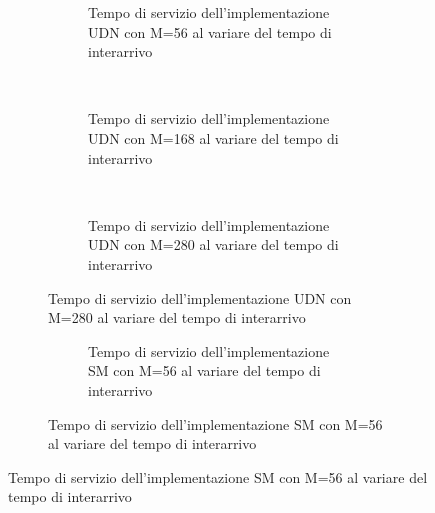 \begin{figure}[p]
  \caption{Grafici del tempo di servizio al variare del tempo di interarrivo}
  \begin{subfigure}[b]{.5\columnwidth}
    \centering
    \renewcommand\thesubfigure{\alph{subfigure}}
    \caption{Implementazione con solo UDN}
    \begin{subfigure}[b]{\textwidth}
      \centering
      \addtocounter{subfigure}{-1}
      \renewcommand\thesubfigure{\alph{subfigure}1}
      \resizebox{\columnwidth}{!}{}
      \caption{Tempo di servizio dell'implementazione UDN con M=56 al variare del tempo di interarrivo}
      \label{fig:scalability_UDN_size56}
    \end{subfigure}
    ~
    \begin{subfigure}[b]{\textwidth}
      \centering
      \addtocounter{subfigure}{-1}
      \renewcommand\thesubfigure{\alph{subfigure}2}
      \resizebox{\columnwidth}{!}{}
      \caption{Tempo di servizio dell'implementazione UDN con M=168 al variare del tempo di interarrivo}
      \label{fig:scalability_UDN_size168}
    \end{subfigure}
    ~
    \begin{subfigure}[b]{\textwidth}
      \centering
      \addtocounter{subfigure}{-1}
      \renewcommand\thesubfigure{\alph{subfigure}3}
      \resizebox{\columnwidth}{!}{}
      \caption{Tempo di servizio dell'implementazione UDN con M=280 al variare del tempo di interarrivo}
      \label{fig:scalability_UDN_size280}
    \end{subfigure}
    \label{fig:allScalbility_UDN}
  \end{subfigure}
  \hspace{2ex}
  \begin{subfigure}[b]{.5\columnwidth}
    \centering
    \renewcommand\thesubfigure{\alph{subfigure}}
    \caption{Implementazione con solo SM}
    \begin{subfigure}[b]{\textwidth}
      \centering
      \addtocounter{subfigure}{-1}
      \renewcommand\thesubfigure{\alph{subfigure}1}
      \resizebox{\columnwidth}{!}{}
      \caption{Tempo di servizio dell'implementazione SM con M=56 al variare del tempo di interarrivo}
      \label{fig:scalability_SM_size56}
    \end{subfigure}

\end{subfigure}
\end{figure}
